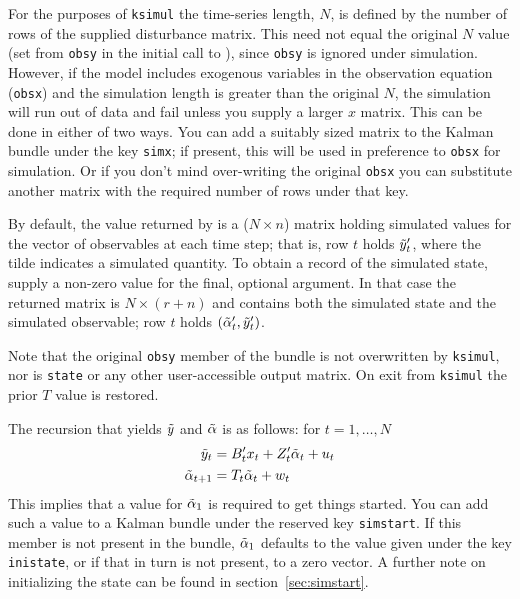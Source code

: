 For the purposes of \texttt{ksimul} the time-series length, $N$, is
defined by the number of rows of the supplied disturbance matrix. This
need not equal the original $N$ value (set from \texttt{obsy} in the
initial call to ), since \texttt{obsy} is ignored under
simulation. However, if the model includes exogenous variables in the
observation equation (\texttt{obsx}) and the simulation length is
greater than the original $N$, the simulation will run out of data and
fail unless you supply a larger $x$ matrix.  This can be done in
either of two ways. You can add a suitably sized matrix to the Kalman
bundle under the key \texttt{simx}; if present, this will be used in
preference to \texttt{obsx} for simulation. Or if you don't mind
over-writing the original \texttt{obsx} you can substitute another
matrix with the required number of rows under that key.

By default, the value returned by  is a ($N \times n$)
matrix holding simulated values for the vector of observables at each
time step; that is, row $t$ holds $\tilde{y}_t'$, where the tilde
indicates a simulated quantity.  To obtain a record of the simulated
state, supply a non-zero value for the final, optional argument. In
that case the returned matrix is $N \times (r+n)$ and contains both
the simulated state and the simulated observable; row $t$ holds
$(\tilde{\alpha}_t', \tilde{y}_t')$.

Note that the original \texttt{obsy} member of the bundle is not
overwritten by \texttt{ksimul}, nor is \texttt{state} or any other
user-accessible output matrix. On exit from \texttt{ksimul} the prior
$T$ value is restored.

The recursion that yields $\tilde{y}$ and $\tilde{\alpha}$
is as follows: for $t=1,\dots,N$
%
\begin{align*}
  \tilde{y}_t &= B_t'x_t + 
   Z_t' \tilde{\alpha}_t + u_t  \\ 
  \tilde{\alpha}_{t+1} &= T_t \tilde{\alpha}_t + w_t
\end{align*}
%
This implies that a value for $\tilde{\alpha}_1$ is required to get
things started. You can add such a value to a Kalman bundle under the
reserved key \texttt{simstart}. If this member is not present in the
bundle, $\tilde{\alpha}_1$ defaults to the value given under the
key \texttt{inistate}, or if that in turn is not present, to a zero
vector. A further note on initializing the state can be found in
section~\ref{sec:simstart}.

